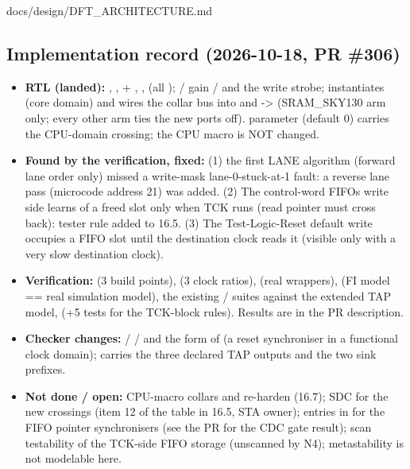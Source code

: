 \begin{relocated}{docs/design/DFT_ARCHITECTURE.md}
\subsection{Implementation record (2026-10-18, PR \#306)}\label{tm:ch:dft-architecture:1610-implementation-record-2026-10-18-pr-306}

\begin{itemize}
\tightlist
\item
  \textbf{RTL (landed):} , ,
   + , ,
   (all );  /
   gain  /  and the
  write strobe;  instantiates  (core
  domain) and wires the collar bus into  and
   -\textgreater{} 
  (SRAM\_\allowbreak{}SKY130 arm only; every other arm ties the new
  ports off).  parameter  (default 0)
  carries the CPU-domain crossing; the CPU macro is NOT changed.
\item
  \textbf{Found by the verification, fixed:} (1) the first LANE
  algorithm (forward lane order only) missed a write-mask
  lane-0-stuck-at-1 fault: a reverse lane pass (microcode address 21)
  was added. (2) The control-word FIFO\textquotesingle s write side
  learns of a freed slot only when TCK runs (read pointer must cross
  back): tester rule added to 16.5. (3) The Test-Logic-Reset default
  write occupies a FIFO slot until the destination clock reads it
  (visible only with a very slow destination clock).
\item
  \textbf{Verification:}  (3 build points),
   (3 clock ratios),  (real
  wrappers),  (FI model == real simulation model),
  the existing  /  suites against the
  extended TAP model,  (+5 tests for the
  TCK-block rules). Results are in the PR description.
\item
  \textbf{Checker changes:} 
   /  / 
  and the  form of  (a
  reset synchroniser in a functional clock domain); 
   carries the three declared TAP outputs and
  the two sink prefixes.
\item
  \textbf{Not done / open:} CPU-macro collars and re-harden (16.7); SDC
  for the new crossings (item 12 of the table in 16.5, STA owner);
   entries in
   for the FIFO pointer synchronisers (see
  the PR for the CDC gate result); scan testability of the TCK-side FIFO
  storage (unscanned by N4); metastability is not modelable here.
\end{itemize}


\end{relocated}
